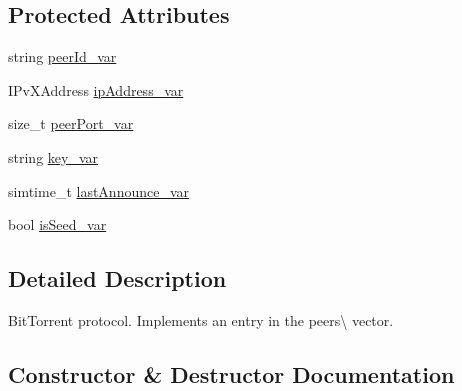 \subsection*{Protected Attributes}
\begin{DoxyCompactItemize}
\item 
string \hyperlink{classBTTrackerStructBase_ae905721d92c8e64e682061215203ebde}{peer\+Id\+\_\+var}
\item 
I\+Pv\+X\+Address \hyperlink{classBTTrackerStructBase_a76d29084d65c22c38761bf8e23eb1a25}{ip\+Address\+\_\+var}
\item 
size\+\_\+t \hyperlink{classBTTrackerStructBase_ad6c17ccdd1cc1a6ae18a5d08c6eabfcc}{peer\+Port\+\_\+var}
\item 
string \hyperlink{classBTTrackerStructBase_a041ac6c48d6829f3d72c1353568e7f43}{key\+\_\+var}
\item 
simtime\+\_\+t \hyperlink{classBTTrackerStructBase_aa46de4fbdf226d5fc79df612538c2005}{last\+Announce\+\_\+var}
\item 
bool \hyperlink{classBTTrackerStructBase_a6c6788c113c4e7ba4ea28ae879bee9d7}{is\+Seed\+\_\+var}
\end{DoxyCompactItemize}


\subsection{Detailed Description}
Bit\+Torrent protocol. Implements an entry in the peers\textbackslash{}\textquotesingle{} vector. 

\subsection{Constructor \& Destructor Documentation}
\hypertarget{classBTTrackerStructBase_a95263b3a44785f5ae58d4b4a8c0df889}{}

